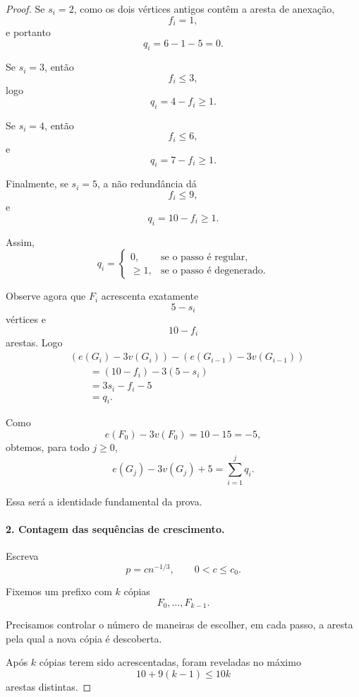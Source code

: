 \documentclass[reqno, 12pt]{amsart}
\numberwithin{equation}{section}
\theoremstyle{plain}
\theoremstyle{definition}
\begin{document}
\begin{proof}
  Se $s_i=2$, como os dois vértices antigos contêm a aresta de
  anexação,
  \[
    f_i=1,
  \]
  e portanto
  \[
    q_i=6-1-5=0.
  \]

  Se $s_i=3$, então
  \[
    f_i\le3,
  \]
  logo
  \[
    q_i=4-f_i\ge1.
  \]

  Se $s_i=4$, então
  \[
    f_i\le6,
  \]
  e
  \[
    q_i=7-f_i\ge1.
  \]

  Finalmente, se $s_i=5$, a não redundância dá
  \[
    f_i\le9,
  \]
  e
  \[
    q_i=10-f_i\ge1.
  \]

  Assim,
  \[
    q_i=
    \begin{cases}
      0,    & \text{se o passo é regular},    \\
      \ge1, & \text{se o passo é degenerado}.
    \end{cases}
    \tag{1}\label{1}
  \]

  Observe agora que $F_i$ acrescenta exatamente
  \[
    5-s_i
  \]
  vértices e
  \[
    10-f_i
  \]
  arestas. Logo
  \[
    \begin{aligned}
       & (e(G_i)-3v(G_i))
      -(e(G_{i-1})-3v(G_{i-1})) \\
       & \qquad
      =(10-f_i)-3(5-s_i)        \\
       & \qquad
      =3s_i-f_i-5               \\
       & \qquad
      =q_i.
    \end{aligned}
  \]

  Como
  \[
    e(F_0)-3v(F_0)
    =
    10-15
    =
    -5,
  \]
  obtemos, para todo $j\ge0$,
  \[
    \boxed{
      e(G_j)-3v(G_j)+5
      =
      \sum_{i=1}^{j}q_i.
    }
    \tag{2}\label{2}
  \]

  Essa será a identidade fundamental da prova.

  \paragraph{2. Contagem das sequências de crescimento.}

  Escreva
  \[
    p=cn^{-1/3},
    \qquad
    0<c\le c_0.
  \]

  Fixemos um prefixo com $k$ cópias
  \[
    F_0,\ldots,F_{k-1}.
  \]

  Precisamos controlar o número de maneiras de escolher, em cada passo,
  a aresta pela qual a nova cópia é descoberta.

  Após $k$ cópias terem sido acrescentadas, foram reveladas no máximo
  \[
    10+9(k-1)
    \le 10k
  \]
  arestas distintas.


\end{proof}
\end{document}
